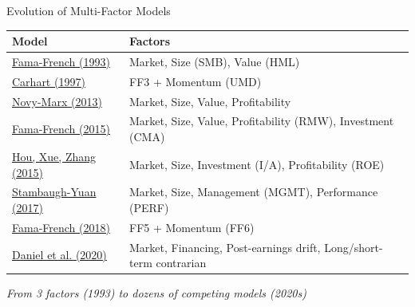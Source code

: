 \documentclass{beamer}
\begin{document}
\begin{frame}{Evolution of Multi-Factor Models}
    \begin{table}
        \scriptsize
        \begin{tabular}{p{3.5cm}p{6cm}}
            \toprule
            \textbf{Model} & \textbf{Factors} \\
            \midrule
            \textcolor{blue}{\href{https://doi.org/10.1016/0304-405X(93)90023-5}{Fama-French (1993)}} & Market, Size (SMB), Value (HML) \\[0.2cm]
            \textcolor{blue}{\href{https://doi.org/10.1111/j.1540-6261.1997.tb03808.x}{Carhart (1997)}} & FF3 + Momentum (UMD) \\[0.2cm]
            \textcolor{blue}{\href{https://doi.org/10.1016/j.jfineco.2013.01.003}{Novy-Marx (2013)}} & Market, Size, Value, Profitability \\[0.2cm]
            \textcolor{blue}{\href{https://doi.org/10.1016/j.jfineco.2014.10.010}{Fama-French (2015)}} & Market, Size, Value, Profitability (RMW), Investment (CMA) \\[0.2cm]
            \textcolor{blue}{\href{https://doi.org/10.1093/rfs/hhu068}{Hou, Xue, Zhang (2015)}} & Market, Size, Investment (I/A), Profitability (ROE) \\[0.2cm]
            \textcolor{blue}{\href{https://doi.org/10.1093/rfs/hhw107}{Stambaugh-Yuan (2017)}} & Market, Size, Management (MGMT), Performance (PERF) \\[0.2cm]
            \textcolor{blue}{\href{https://doi.org/10.1016/j.jfineco.2018.02.012}{Fama-French (2018)}} & FF5 + Momentum (FF6) \\[0.2cm]
            \textcolor{blue}{\href{https://doi.org/10.1093/rfs/hhz069}{Daniel et al. (2020)}} & Market, Financing, Post-earnings drift, Long/short-term contrarian \\
            \bottomrule
        \end{tabular}
    \end{table}
    
    
    \textit{From 3 factors (1993) to dozens of competing models (2020s)}
\end{frame}
\end{document}
